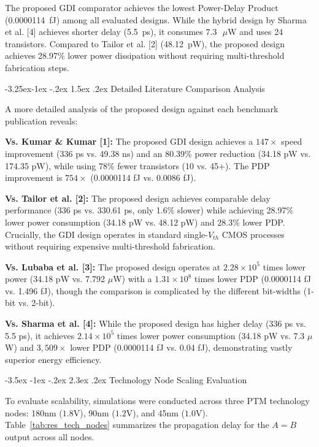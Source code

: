\documentclass[12pt,a4paper,oneside]{report}
\makeatletter
\renewcommand\section{\@startsection {section}{1}{\z@}%
                                   {-3.5ex \@plus -1ex \@minus -.2ex}%
                                   {2.3ex \@plus.2ex}%
                                   {\normalfont\normalsize\bfseries}}
\renewcommand\subsection{\@startsection{subsection}{2}{\z@}%
                                     {-3.25ex\@plus -1ex \@minus -.2ex}%
                                     {1.5ex \@plus .2ex}%
                                     {\normalfont\normalsize\bfseries\itshape}}
\makeatother
\begin{document}
The proposed GDI comparator achieves the lowest Power-Delay Product (0.0000114~fJ) among all evaluated designs. While the hybrid design by Sharma et al. [4] achieves shorter delay (5.5~ps), it consumes $7.3\text{ }\mu\text{W}$ and uses 24 transistors. Compared to Tailor et al. [2] (48.12~pW), the proposed design achieves 28.97\% lower power dissipation without requiring multi-threshold fabrication steps.

\subsection{Detailed Literature Comparison Analysis}

A more detailed analysis of the proposed design against each benchmark publication reveals:

\noindent\textbf{Vs. Kumar \& Kumar [1]:} The proposed GDI design achieves a $147\times$ speed improvement (336 ps vs. 49.38 ns) and an 80.39\% power reduction (34.18 pW vs. 174.35 pW), while using 78\% fewer transistors (10 vs. 45+). The PDP improvement is $754\times$ (0.0000114 fJ vs. 0.0086 fJ).

\noindent\textbf{Vs. Tailor et al. [2]:} The proposed design achieves comparable delay performance (336 ps vs. 330.61 ps, only 1.6\% slower) while achieving 28.97\% lower power consumption (34.18 pW vs. 48.12 pW) and 28.3\% lower PDP. Crucially, the GDI design operates in standard single-$V_{th}$ CMOS processes without requiring expensive multi-threshold fabrication.

\noindent\textbf{Vs. Lubaba et al. [3]:} The proposed design operates at $2.28 \times 10^5$ times lower power (34.18 pW vs. 7.792 $\mu$W) with a $1.31 \times 10^8$ times lower PDP (0.0000114 fJ vs. 1.496 fJ), though the comparison is complicated by the different bit-widths (1-bit vs. 2-bit).

\noindent\textbf{Vs. Sharma et al. [4]:} While the proposed design has higher delay (336 ps vs. 5.5 ps), it achieves $2.14 \times 10^5$ times lower power consumption (34.18 pW vs. 7.3 $\mu$W) and $3,509\times$ lower PDP (0.0000114 fJ vs. 0.04 fJ), demonstrating vastly superior energy efficiency.

\section{Technology Node Scaling Evaluation}

To evaluate scalability, simulations were conducted across three PTM technology nodes: 180nm ($1.8\text{V}$), 90nm ($1.2\text{V}$), and 45nm ($1.0\text{V}$). Table~\ref{tab:res_tech_nodes} summarizes the propagation delay for the $A=B$ output across all nodes.
\end{document}

